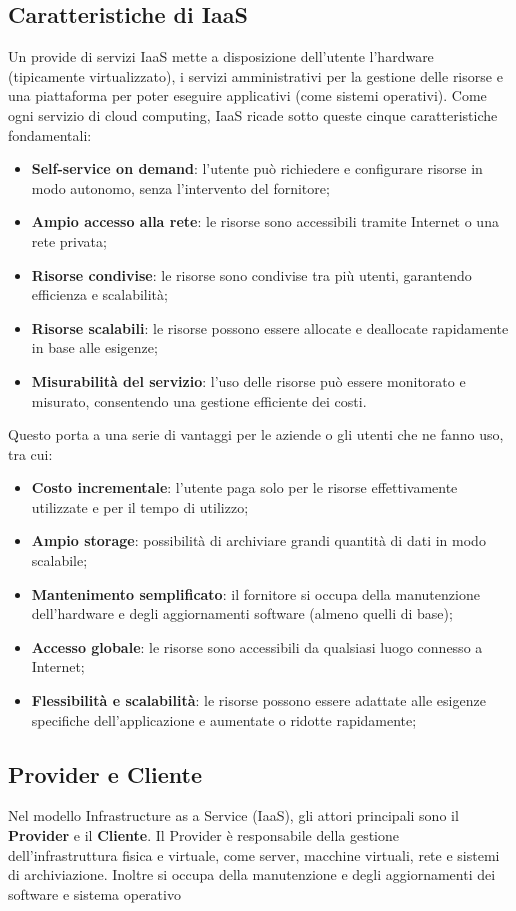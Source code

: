 \documentclass[12pt,a4paper,openright,twoside]{book}
\begin{document}
\subsection{Caratteristiche di IaaS}
Un provide di servizi IaaS mette a disposizione dell'utente l'hardware (tipicamente virtualizzato), i servizi amministrativi per la gestione delle risorse e una piattaforma per poter eseguire applicativi (come sistemi operativi).
Come ogni servizio di cloud computing, IaaS ricade sotto queste cinque caratteristiche fondamentali:
\begin{itemize}
    \item \textbf{Self-service on demand}: l'utente può richiedere e configurare risorse in modo autonomo, senza l'intervento del fornitore;
    \item \textbf{Ampio accesso alla rete}: le risorse sono accessibili tramite Internet o una rete privata;
    \item \textbf{Risorse condivise}: le risorse sono condivise tra più utenti, garantendo efficienza e scalabilità;
    \item \textbf{Risorse scalabili}: le risorse possono essere allocate e deallocate rapidamente in base alle esigenze;
    \item \textbf{Misurabilità del servizio}: l'uso delle risorse può essere monitorato e misurato, consentendo una gestione efficiente dei costi.
\end{itemize}
Questo porta a una serie di vantaggi per le aziende o gli utenti che ne fanno uso, tra cui:
\begin{itemize}
    \item \textbf{Costo incrementale}: l'utente paga solo per le risorse effettivamente utilizzate e per il tempo di utilizzo;
    \item \textbf{Ampio storage}: possibilità di archiviare grandi quantità di dati in modo scalabile;
    \item \textbf{Mantenimento semplificato}: il fornitore si occupa della manutenzione dell'hardware e degli aggiornamenti software (almeno quelli di base);
    \item \textbf{Accesso globale}: le risorse sono accessibili da qualsiasi luogo connesso a Internet;
    \item \textbf{Flessibilità e scalabilità}: le risorse possono essere adattate alle esigenze specifiche dell'applicazione e aumentate o ridotte rapidamente;
\end{itemize}

\subsection{Provider e Cliente}
\label{subsec:provider_cliente}
Nel modello Infrastructure as a Service (IaaS), gli attori principali sono il \textbf{Provider} e il \textbf{Cliente}. Il Provider è responsabile della gestione dell'infrastruttura fisica e virtuale, come server, macchine virtuali, rete e sistemi di archiviazione. Inoltre si occupa della manutenzione e degli aggiornamenti dei software e sistema operativo 
\end{document}
